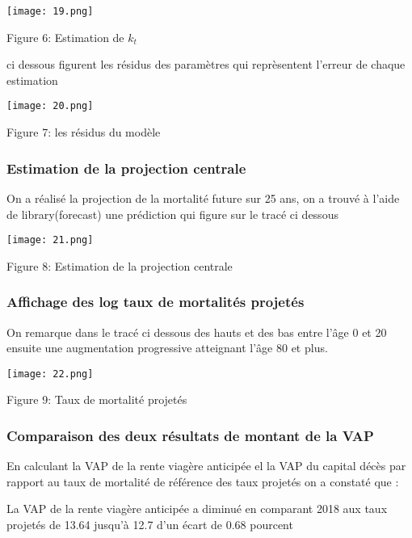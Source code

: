 \documentclass{article}
\begin{document}
{\texttt{[image: 19.png]}
\begin{center}
    {\large Figure 6: Estimation de $k_{t}$}
\end{center}

{\large ci dessous figurent les résidus des paramètres qui reprèsentent l'erreur de chaque estimation}

\texttt{[image: 20.png]}

\begin{center}
    {\large Figure 7: les résidus du modèle}
\end{center}
 

\subsubsection{Estimation de la projection centrale}
{\large On a réalisé la projection de la mortalité future sur 25 ans, on a trouvé à l'aide de library(forecast) une prédiction qui figure sur le tracé ci dessous}

\texttt{[image: 21.png]}

\begin{center}
    {\large Figure 8: Estimation de la projection centrale}
\end{center}

\subsubsection{Affichage  des log taux de mortalités projetés}
{\large On remarque dans le tracé ci dessous  des hauts et des bas entre l'âge 0 et 20 ensuite une augmentation progressive  atteignant l'âge 80 et plus.}

\texttt{[image: 22.png]}

\begin{center}
    {\large Figure 9: Taux de mortalité projetés}
\end{center}
\subsubsection{Comparaison des deux résultats  de montant de la VAP}
{\large En calculant la VAP de la rente viagère anticipée el la VAP du capital décès par rapport au taux de mortalité de référence des taux projetés on a constaté que :}

{\large La VAP de la rente viagère anticipée a diminué en comparant 2018 aux taux projetés de 13.64 jusqu'à 12.7 d'un écart de 0.68 pourcent }

}
\end{document}
